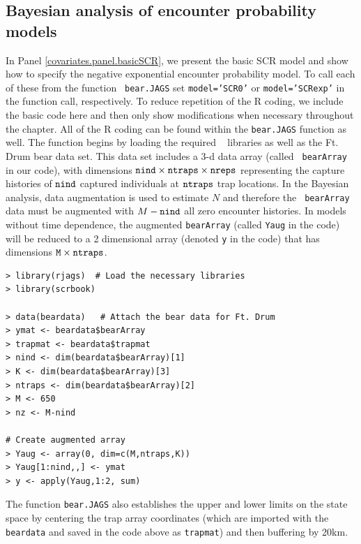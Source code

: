 \subsection{Bayesian analysis of encounter probability models}

In Panel \ref{covariates.panel.basicSCR}, we present the basic SCR
model and show how to specify the negative exponential encounter
probability model.  To call each of these from the function {\tt
  bear.JAGS} set {\tt model='SCR0'} or {\tt model='SCRexp'} in the
function call, respectively.  To reduce repetition of the R coding, we
include the basic code here and then only show modifications when
necessary throughout the chapter.  All of the R coding can be found
within the {\tt bear.JAGS} function as well.  The function begins by
loading the required \R~ libraries as well as the Ft. Drum bear data
set.  This data set includes a 3-d data array (called \mbox{\tt
  bearArray} in our code), with dimensions $\mbox{\tt nind} \times
\mbox{\tt ntraps} \times \mbox{\tt nreps}$ representing the capture
histories of $\mbox{\tt nind}$ captured individuals at $\mbox{\tt
  ntraps}$ trap locations.  In the Bayesian analysis, data
augmentation is used to estimate $N$ and therefore the \mbox{\tt
  bearArray} data must be augmented with $M - \mbox{\tt nind}$ all
zero encounter histories.  In models without time dependence, the
augmented \mbox{\tt bearArray} (called \mbox{\tt Yaug} in the code)
will be reduced to a 2 dimensional array (denoted \mbox{\tt y} in the
code) that has dimensions $\mbox{\tt M} \times \mbox{\tt ntraps}$.

\begin{verbatim}
> library(rjags)  # Load the necessary libraries
> library(scrbook)

> data(beardata)   # Attach the bear data for Ft. Drum
> ymat <- beardata$bearArray
> trapmat <- beardata$trapmat
> nind <- dim(beardata$bearArray)[1]
> K <- dim(beardata$bearArray)[3]
> ntraps <- dim(beardata$bearArray)[2]
> M <- 650
> nz <- M-nind

# Create augmented array
> Yaug <- array(0, dim=c(M,ntraps,K))
> Yaug[1:nind,,] <- ymat
> y <- apply(Yaug,1:2, sum)
\end{verbatim}


The function {\tt bear.JAGS} also establishes the upper 
and lower limits on the state space by centering the trap
array coordinates (which are imported with the {\tt beardata}
and saved in the code above as {\tt trapmat}) and then buffering by 20km.  


